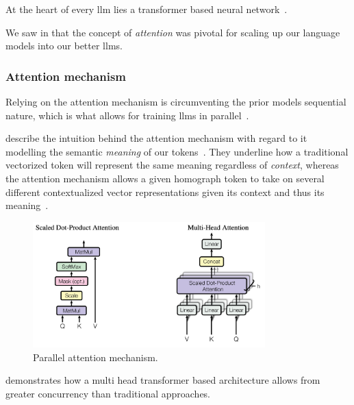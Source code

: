 At the heart of every \acrshort{llm} lies a transformer based neural
network~\cite[4]{llmSurvey}.

We saw in  that the \citeauthor{attentionIsAllYouNeed} concept
of \textit{attention} was pivotal for scaling up our language models into our
better \acrlong{llms}.

\subsubsection{Attention mechanism}

Relying on the attention mechanism is circumventing the
prior models sequential nature, which is what allows for training \acrlong{llms}
in parallel~\cite[2]{attentionIsAllYouNeed}.

\citeauthor{jm} describe the intuition behind the attention mechanism with
regard to it modelling the semantic \textit{meaning} of our
tokens~\cite[185]{jm}. They underline how a traditional vectorized token will
represent the same meaning regardless of \textit{context}, whereas the attention
mechanism allows a given homograph token to take on several different
contextualized vector representations given its context and thus its
meaning~\cite[185-186]{jm}.



\begin{figure}[h]
    \centering
    \includegraphics[width=0.8\textwidth]{figures/attentionArches.png}
    \caption[Parallel attention mechanism]{Parallel attention mechanism.\footnotemark}\label{fig:paraAttention}
\end{figure}


 demonstrates how a multi head transformer based architecture
allows from greater concurrency than traditional approaches.

